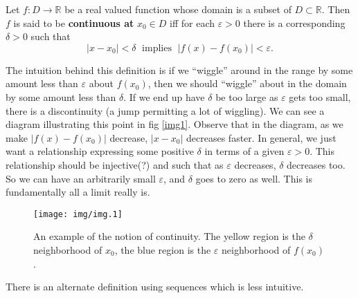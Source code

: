 

\begin{defn} 
Let $f:D\to\mathbb{R}$ be a real valued function whose domain is a subset of
$D\subset\mathbb{R}$. Then $f$ is said to be
\textbf{continuous at} 
$x_{0}\in D$ iff for each $\varepsilon>0$ there is a
corresponding $\delta>0$ such that
\begin{equation}
|x-x_0|<\delta\;\text{ implies }\;|f(x)-f(x_0)|<\varepsilon.
\end{equation}
\end{defn}
\begin{rmk}
The intuition behind this definition is if we ``wiggle'' around
in the range by some amount less than $\varepsilon$ about $f(x_0)$, then
we should ``wiggle'' about in the domain by some amount less than
$\delta$. If we end up have $\delta$ be too large as
$\varepsilon$ gets too small, there is a discontinuity (a jump
permitting a lot of wiggling). We can see a diagram illustrating
this point in fig \eqref{img1}. Observe that in the diagram, as
we make $|f(x)-f(x_{0})|$ decrease, $|x-x_{0}|$ decreases
faster. In general, we just want a relationship expressing some positive
$\delta$ in terms of a given $\varepsilon>0$. This relationship
should be injective(?) and such that as $\varepsilon$ decreases,
$\delta$ decreases too. So we can have an arbitrarily small
$\varepsilon$, and $\delta$ goes to zero as well. This is
fundamentally all a limit really is.
\end{rmk}
\begin{figure}
\texttt{[image: img/img.1]}
\caption{An example of the notion of continuity. The yellow
  region is the $\delta$ neighborhood of $x_{0}$, the blue region
  is the $\varepsilon$ neighborhood of $f(x_{0})$.}\label{img1}
\end{figure}

There is an alternate definition using sequences which is less
intuitive.

